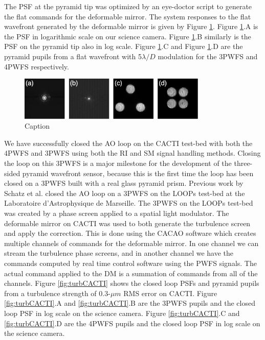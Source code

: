 \documentclass[12pt]{spieman}  %
\begin{document}
\begin{spacing}{2}
The PSF at the pyramid tip was optimized by an eye-doctor script to generate the flat commands for the deformable mirror. The system responses to the flat wavefront generated by the deformable mirror is given by Figure \ref{fig:flatCACTI}. Figure \ref{fig:flatCACTI}.A is the PSF in logarithmic scale on our science camera. Figure \ref{fig:flatCACTI}.B similarly is the PSF on the pyramid tip also in log scale. Figure  \ref{fig:flatCACTI}.C and Figure \ref{fig:flatCACTI}.D are the pyramid pupils from a flat wavefront with 5$\lambda/D$ modulation for the 3PWFS and 4PWFS respectively. 

\begin{figure}
    \centering
    \includegraphics[width=0.8\textwidth]{flatCACTI.png}
    \caption{Caption}
    \label{fig:flatCACTI}
\end{figure}


We have successfully closed the AO loop on the CACTI test-bed with both the 4PWFS and 3PWFS using both the RI and SM signal handling methods. Closing the loop on this 3PWFS is a major milestone for the development of the three-sided pyramid wavefront sensor, because this is the first time the loop has been closed on a 3PWFS built with a real glass pyramid prism. Previous work by Schatz et al. closed the AO loop on a 3PWFS on the LOOPs test-bed at the Laboratoire d'Astrophysique de Marseille. The 3PWFS on the LOOPs test-bed was created by a phase screen applied to a spatial light modulator. The deformable mirror on CACTI was used to both generate the turbulence screen and apply the correction. This is done using the CACAO software which creates multiple channels of commands for the deformable mirror. In one channel we can stream the turbulence phase screens, and in another channel we have the commands computed by real time control software using the PWFS signals. The actual command applied to the DM is a summation of commands from all of the channels. Figure \ref{fig:turbCACTI} shows the closed loop PSFs and pyramid pupils from a turbulence strength of 0.3-$\mu m$ RMS error on CACTI. Figure \ref{fig:turbCACTI}.A and \ref{fig:turbCACTI}.B are the 3PWFS pupils and the closed loop PSF in log scale on the science camera. Figure \ref{fig:turbCACTI}.C and \ref{fig:turbCACTI}.D are the 4PWFS pupils and the closed loop PSF in log scale on the science camera.



\end{spacing}
\end{document}
